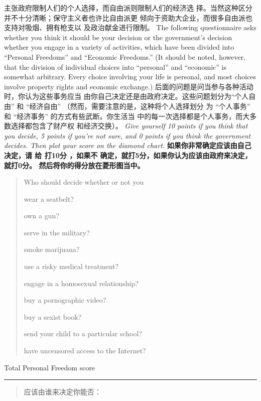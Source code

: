 \begin{paracol}{2}
主张政府限制人们的个人选择，而自由派则限制人们的经济选
择。当然这种区分并不十分清晰；保守主义者也许比自由派更
倾向于资助大企业，而很多自由派也支持对吸烟、拥有枪支以
及政治献金进行限制。
\switchcolumn*
The following questionnaire asks whether you think it
should be your decision or the government's decision whether you engage in a variety of activities, which have been divided into
``Personal Freedoms'' and ``Economic Freedoms.'' (It should be
noted, however, that the division of individual choices into
``personal'' and ``economic'' is somewhat arbitrary. Every choice
involving your life is personal, and most choices involve property rights and economic exchange.)
\switchcolumn
后面的问题是问当参与各种活动时，你认为这些事务应当
由你自己决定还是由政府决定。这些问题划分为“个人自由”
和 “经济自由” （然而，需要注意的是，这种将个人选择划分
为 “个人事务” 和 “经济事务” 的方式有些武断。你生活当
中的每一次选择都是个人事务，而大多数选择都包含了财产权
和经济交换）。
\switchcolumn*
\textit{Give yourself 10 points if you think that you decide, 5 points if you're not sure,
and 0 points if you think the government decides. Then plot your score on the
diamond chart.}
\switchcolumn
\textbf{如果你非常确定应该由自己决定，请 给 打10分 ，如果不
确定，就打5分，如果你认为应该由政府来决定，就打0分。
然后将你的得分放在菱形图当中。}

\begin{quotation}
\noindent Who should decide whether or not you

wear a seatbelt?

own a gun?

serve in the military?

smoke marijuana?

use a risky medical treatment?

engage in a homosexual relationship?

buy a pornographic video?

buy a sexist book?

send your child to a particular school?

have uncensored access to the Internet?
\end{quotation}

\noindent Total Personal Freedom score\rule[0pt]{2cm}{0.5pt}
\switchcolumn
\begin{quotation}
\noindent 应该由谁来决定你能否：


\end{quotation}
\end{paracol}
